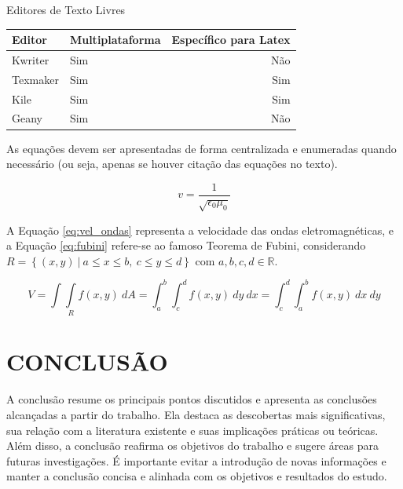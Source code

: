 \documentclass{iftex2024}
\begin{document}
\begin{board}[!htb] \centering
\caption{Editores de Texto Livres} \label{quadro:editores_texto_livres}
\begin{varwidth}{\linewidth}
\begin{tabular}{|l|l|r|}        \hline
Editor     & Multiplataforma & Específico para Latex \\ \hline
Kwriter    & Sim             & Não                   \\
Texmaker   & Sim             & Sim                   \\
Kile       & Sim             & Sim                   \\
Geany      & Sim             & Não                   \\ \hline
\end{tabular}
\end{varwidth}
\end{board}

As equações devem ser apresentadas de forma centralizada e enumeradas quando necessário (ou seja, apenas se houver citação das equações no texto).

\begin{equation} \label{eq:vel_ondas}
 v=\frac{1}{\sqrt{\epsilon_0\mu_0}}
\end{equation}

A Equação \eqref{eq:vel_ondas} representa a velocidade das ondas eletromagnéticas, e a Equação \eqref{eq:fubini} refere-se ao famoso Teorema de Fubini, considerando $R=\left\{(x,y)~|~a\leq x\leq b,~c\leq y\leq d\right\}$ com $a,b,c,d\in\mathbb{R}$.

\begin{equation} \label{eq:fubini}
 V=\int\int\limits_R f(x,y)~dA=\int_a^b\int_c^d f(x,y)~dy~dx=\int_c^d\int_a^b f(x,y)~dx~dy
\end{equation}

\chapter{CONCLUSÃO}

A conclusão resume os principais pontos discutidos e apresenta as conclusões alcançadas a partir do trabalho.
Ela destaca as descobertas mais significativas, sua relação com a literatura existente e suas implicações práticas ou teóricas.
Além disso, a conclusão reafirma os objetivos do trabalho e sugere áreas para futuras investigações.
É importante evitar a introdução de novas informações e manter a conclusão concisa e alinhada com os objetivos e resultados do estudo.
\end{document}
